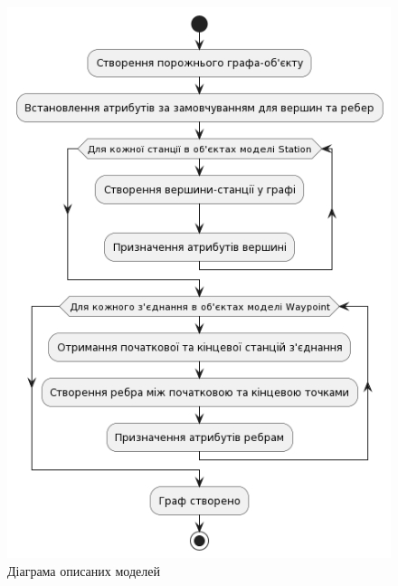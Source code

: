 \begin{figure}[!h]
    \centering
    \includegraphics[scale=0.6]{content/chapters/2-implementation-methods/assets/img/models-to-graph_diagram.png}
    \caption{Діаграма описаних моделей}
    \label{fig:bfs}
\end{figure}